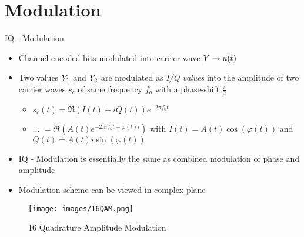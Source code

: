 \documentclass[xcolor=table,mathserif,9pt]{beamer}    %
\newcommand{\ubar}[1]{\underaccent{\bar}{#1}}
\begin{document}
\section{Modulation}%
\begin{frame}{IQ - Modulation}

\begin{itemize}
	\item Channel encoded bits modulated into carrier wave $\ubar{Y} \to u(t)$
	\item Two values $\ubar{Y}_1$ and $\ubar{Y}_2$ are modulated as \emph{I/Q values} into the amplitude of two carrier 
	      waves $s_c$ of same frequency $f_o$ with a phase-shift $\frac{\pi}{2}$
	\begin{itemize}
		\item $s_c(t) = \Re{(I(t) + iQ(t))e^{-2\pi f_0 t}}$
		\item ... $ = \Re{(A(t)e^{-2\pi i f_o t + \varphi(t) i})}$ with $I(t) = A(t)\cos(\varphi(t))$ and $Q(t) = A(t)i\sin(\varphi(t))$
	\end{itemize}
	\item IQ - Modulation is essentially the same as combined modulation of phase and amplitude
	\item Modulation scheme can be viewed in complex plane
\end{itemize}

\begin{figure}[htpb]
	\centering
	\texttt{[image: images/16QAM.png]}
	\caption{16 Quadrature Amplitude Modulation \cite{CommTech}}
	\label{fig:16QAM}
\end{figure}
\end{frame}
\end{document}
